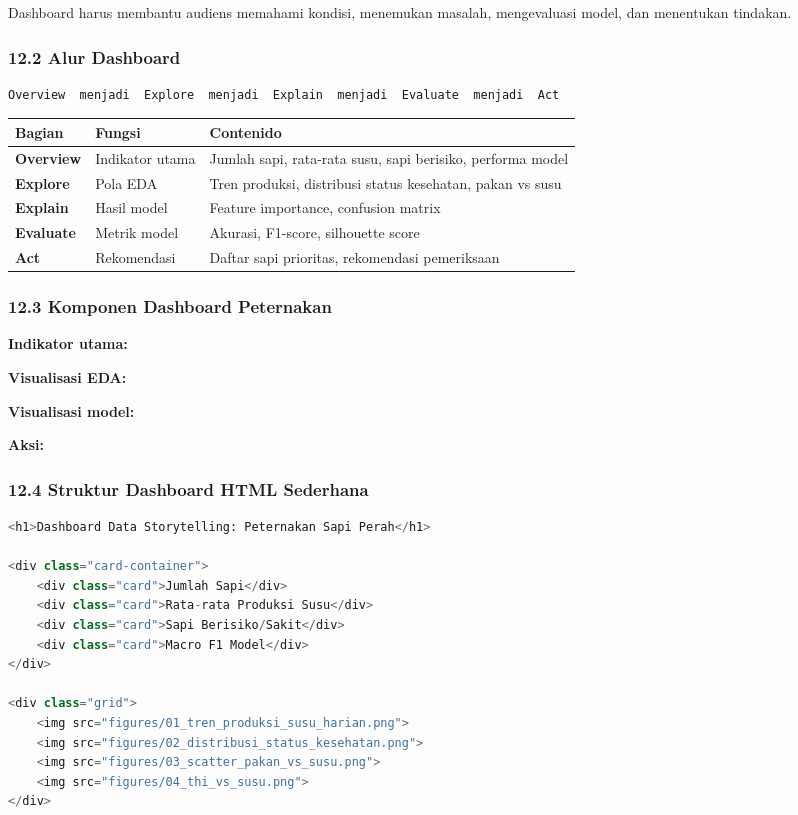 \documentclass[12pt,a4paper]{article}
\begin{document}
Dashboard harus membantu audiens memahami kondisi, menemukan masalah, mengevaluasi model, dan menentukan tindakan.


\subsubsection{12.2 Alur Dashboard}

\begin{lstlisting}[language=Python]
Overview  menjadi  Explore  menjadi  Explain  menjadi  Evaluate  menjadi  Act
\end{lstlisting}

\begin{tabular}{|l|l|l|}
\hline
Bagian & Fungsi & Contenido \\
\hline
\textbf{Overview} & Indikator utama & Jumlah sapi, rata-rata susu, sapi berisiko, performa model \\
\hline
\textbf{Explore} & Pola EDA & Tren produksi, distribusi status kesehatan, pakan vs susu \\
\hline
\textbf{Explain} & Hasil model & Feature importance, confusion matrix \\
\hline
\textbf{Evaluate} & Metrik model & Akurasi, F1-score, silhouette score \\
\hline
\textbf{Act} & Rekomendasi & Daftar sapi prioritas, rekomendasi pemeriksaan \\
\hline
\end{tabular}


\subsubsection{12.3 Komponen Dashboard Peternakan}

\textbf{Indikator utama:}


\textbf{Visualisasi EDA:}


\textbf{Visualisasi model:}


\textbf{Aksi:}


\subsubsection{12.4 Struktur Dashboard HTML Sederhana}

\begin{lstlisting}[language=Python]
<h1>Dashboard Data Storytelling: Peternakan Sapi Perah</h1>

<div class="card-container">
    <div class="card">Jumlah Sapi</div>
    <div class="card">Rata-rata Produksi Susu</div>
    <div class="card">Sapi Berisiko/Sakit</div>
    <div class="card">Macro F1 Model</div>
</div>

<div class="grid">
    <img src="figures/01_tren_produksi_susu_harian.png">
    <img src="figures/02_distribusi_status_kesehatan.png">
    <img src="figures/03_scatter_pakan_vs_susu.png">
    <img src="figures/04_thi_vs_susu.png">
</div>
\end{lstlisting}
\end{document}
